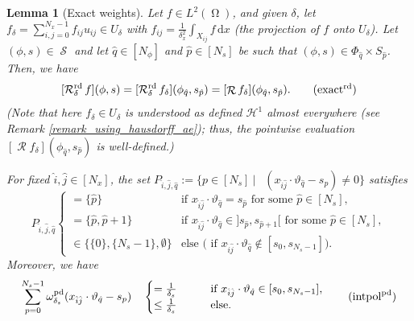 \documentclass[11pt,reqno]{amsart}
\newcommand{\sumx}{\sum_{i,j=0}^{N_x-1}}
\newcommand{\sums}{\sum_{p=0}^{N_s-1}}
\DeclareMathOperator{\Radon}{\mathcal{R}}
\DeclareMathOperator{\RayRadon}{\mathcal{R}^\mathrm{rd}_{\delta}}
\DeclareMathOperator{\PixelWeight}{\omega^\mathrm{pd}_{\delta_\mathit{s}}}
\DeclareMathOperator{\imgdom}{\Omega}
\DeclareMathOperator{\sinodom}{\mathcal{S}}
\newcommand{\dd}[1]{\,\mathrm{d}{#1}}
\numberwithin{theorem}{section}
\newtheorem{lemma}[theorem]{Lemma}
\theoremstyle{remark}
\begin{document}
\begin{lemma}[Exact weights] \label{Lemma_weight_length}
Let $f\in L^2(\imgdom)$, and given $\delta$, let $f_\delta =\sumx f_{ij}u_{ij}\in U_\delta$ with $f_{ij}=\frac{1}{\delta_x^2}\int_{X_{ij}}f \dd x$ (the projection of $f$ onto $U_\delta$). Let $(\phi,s)\in \sinodom$ and let $\hat q\in [N_\phi]$ and $\hat p\in [N_s]$ be such that $(\phi,s)\in \Phi_{\hat q}\times S_{\hat p}$. Then, we have
\begin{equation}
\label{equ_lemma_exact_on_U}
[\RayRadon f](\phi,s) = [\RayRadon f_\delta] (\phi_{\hat q},s_{\hat p})= [\Radon f_\delta] (\phi_{\hat q},s_{\hat p}).  
\tag{$\mathrm{exact}^\mathrm{rd}$}
\end{equation}
(Note that here $f_\delta \in U_\delta$ is understood as defined $\mathcal{H}^1$ almost everywhere (see Remark \ref{remark_using_hausdorff_ae}); thus, the pointwise evaluation $[\Radon f_\delta] (\phi_{\hat q},s_{\hat p})$ is well-defined.)

For fixed $\hat i,\hat j\in [N_x]$, the set $P_{\hat i,\hat j,\hat q}:=\{p\in [N_s] \ \big|\ \PixelWeight(x_{\hat i \hat j}\cdot \vartheta_{\hat q} -s_p)\neq 0\}$ satisfies
\begin{equation} \label{equ_lemma_relevant_p_pd}
P_{\hat i,\hat j,\hat q}  \begin{cases}
=\{\hat p\} & \text{if }x_{\hat i \hat j}\cdot\vartheta_{\hat q}=s_{\hat p}  \text{ for some }\hat p\in [N_s],
\\
=\{\hat p,\hat p+1\} \qquad &\text{if }x_{\hat i \hat j}\cdot\vartheta_{\hat q}\in ]s_{\hat p},s_{\hat p+1}[ \text{ for some }\hat p\in [N_s],
\\
\in \{\{0\},\{N_s-1\},\emptyset\} &  \text{else ( if $x_{\hat i \hat j}\cdot\vartheta_{\hat q} \not \in [s_{0},s_{N_s-1}]$)}.
\end{cases}
\end{equation}
Moreover, we have
\begin{equation}
\label{equ_lemma_pixel_sum_s}
    \sums \PixelWeight(x_{\hat i \hat j}\cdot \vartheta_{\hat q} -s_p) \quad  \begin{cases} =\frac{1}{\delta_s} \qquad & \text{if } x_{\hat i \hat j}\cdot \vartheta_{\hat q}\in [s_0,s_{N_s-1}],
    \\
    \leq \frac{1}{\delta_s} & \text{else}.
\end{cases}    
    \tag{$\mathrm{intpol}^{\mathrm {pd}}$}
\end{equation}

\end{lemma}
\end{document}
